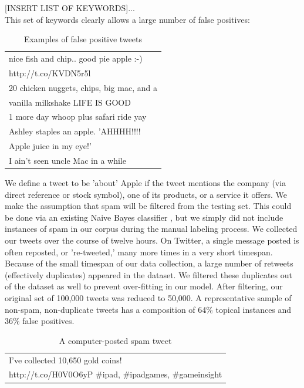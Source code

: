 \documentclass[letterpaper]{article}
\begin{document}
[INSERT LIST OF KEYWORDS]...\\

This set of keywords clearly allows a large number of false positives:

\begin{table}[h]
\centering
\begin{tabular}{|l|}
	\hline
	nice fish and chip.. good pie apple :-) \\ http://t.co/KVDN5r5l \\ \hline
	20 chicken nuggets, chips, big mac, and a \\ vanilla milkshake LIFE IS GOOD \\ \hline
	1 more day whoop plus safari ride yay \\ \hline
	Ashley staples an apple.  'AHHHH!!!! \\ Apple juice in my eye!' \\ \hline
	I ain't seen uncle Mac in a while \\
	\hline
\end{tabular}
\caption{Examples of false positive tweets}
\label{tab:myfirsttable}
\end{table}


We define a tweet to be 'about' Apple if the tweet mentions the company (via direct reference or stock symbol), one of its products, or a service it offers. We make the assumption that spam will be filtered from the testing set. This could be done via an existing Naive Bayes classifier %
, but we simply did not include instances of spam in our corpus during the manual labeling process. We collected our tweets over the course of twelve hours. On Twitter, a single message posted is often reposted, or 're-tweeted,' many more times in a very short timespan. Because of the small timespan of our data collection, a large number of retweets (effectively duplicates) appeared in the dataset. We filtered these duplicates out of the dataset as well to prevent over-fitting in our model. After filtering, our original set of 100,000 tweets was reduced to 50,000. A representative sample of non-spam, non-duplicate tweets has a composition of 64\% topical instances and 36\% false positives.

\begin{table}[h]
\centering
\begin{tabular}{|l|}
	\hline
	I've collected 10,650 gold coins! \\ http://t.co/H0V0O6yP \#ipad, \#ipadgames, \#gameinsight\\
	\hline
\end{tabular}
\caption{A computer-posted spam tweet}
\end{table}
\end{document}
